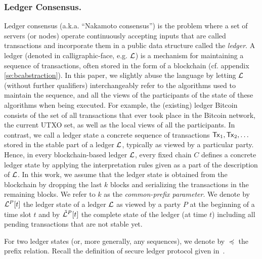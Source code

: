 \subsubsection{Ledger Consensus.}
Ledger consensus (a.k.a. ``Nakamoto consensus'') is the problem where a set of servers
(or nodes) operate continuously accepting inputs
that are called transactions and incorporate them in a public data 
structure called the {\em ledger}. 
A ledger (denoted in calligraphic-face, e.g. $\mathcal{L}$) is a mechanism for maintaining a sequence of transactions, often
stored in the form of a blockchain (cf. appendix \ref{se:bcabstraction}). In this paper, we slightly abuse the language by letting $\mathcal{L}$ (without further
qualifiers) interchangeably refer to the algorithms used to maintain the sequence, and all the views of the
participants of the state of these algorithms when being executed. For example, the (existing) ledger Bitcoin
consists of the set of all transactions that ever took place in the Bitcoin network, the current UTXO set, as
well as the local views of all the participants.
In contrast, we call a ledger state a concrete sequence of transactions $\mathsf{Tx}_1,\mathsf{Tx}_2,\dots$ stored in the stable
part of a ledger $\mathcal{L}$, typically as viewed by a particular party. Hence, in every blockchain-based ledger $\mathcal{L}$,
every fixed chain $C$ defines a concrete ledger state by applying the interpretation rules given as a part of the
description of $\mathcal{L}$. In this work, we assume that the ledger state is obtained from the blockchain by dropping the last $k$ blocks
and serializing the transactions in the remaining blocks. We refer to $k$ as the \emph{common-prefix parameter}.
We denote by $\mathcal{L}^P[t]$ the ledger state of a ledger $\mathcal{L}$ as viewed by a party $P$ at the beginning of a time slot $t$
and by ${\check {\mathcal{L}}}^{P}[t]$ the complete state of the ledger (at time $t$) including all pending transactions that are not stable yet. 


For two ledger states (or, more generally, any sequences), we denote by $\preceq$ the prefix relation.
Recall the definition of secure ledger protocol given in~\cite{sok}.


